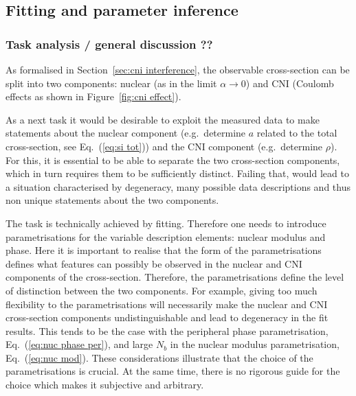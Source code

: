 \subsection{Fitting and parameter inference}
\label{sec:cni fitting}

\subsubsection{Task analysis / general discussion ??}
\label{sec:cni task discussion}

As formalised in Section~\ref{sec:cni interference}, the observable cross-section can be split into two components: nuclear (as in the limit $\alpha\to 0$) and CNI (Coulomb effects as shown in Figure~\ref{fig:cni effect}).

As a next task it would be desirable to exploit the measured data to make statements about the nuclear component (e.g.~determine $a$ related to the total cross-section, see Eq.~(\ref{eq:si tot})) and the CNI component (e.g.~determine $\rho$). For this, it is essential to be able to separate the two cross-section components, which in turn requires them to be sufficiently distinct. Failing that, would lead to a situation characterised by degeneracy, many possible data descriptions and thus non unique statements about the two components.

The task is technically achieved by fitting. Therefore one needs to introduce parametrisations for the variable description elements: nuclear modulus and phase. Here it is important to realise that the form of the parametrisations defines what features can possibly be observed in the nuclear and CNI components of the cross-section. Therefore, the parametrisations define the level of distinction between the two components. For example, giving too much flexibility to the parametrisations will necessarily make the nuclear and CNI cross-section components undistinguishable and lead to degeneracy in the fit results. This tends to be the case with the peripheral phase parametrisation, Eq.~(\ref{eq:nuc phase per}), and large $N_b$ in the nuclear modulus parametrisation, Eq.~(\ref{eq:nuc mod}). These considerations illustrate that the choice of the parametrisations is crucial. At the same time, there is no rigorous guide for the choice which makes it subjective and arbitrary.

